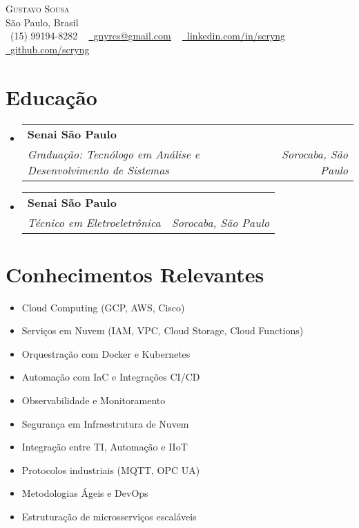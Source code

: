 \documentclass[letterpaper,11pt]{article}
\makeatletter
\newcommand{\resumeSubheading}[4]{
  \vspace{-2pt}\item
    \begin{tabular*}{1.0\textwidth}[t]{l@{\extracolsep{\fill}}r}
      \textbf{#1} & \textbf{\small #2} \\
      \textit{\small#3} & \textit{\small #4} \\
    \end{tabular*}\vspace{-7pt}
}
\newcommand{\resumeSubHeadingListStart}{\begin{itemize}[leftmargin=0.0in, label={}]}
\newcommand{\resumeSubHeadingListEnd}{\end{itemize}}
\makeatother
\begin{document}
\begin{center}
    {\Huge \scshape Gustavo Sousa} \\ \vspace{1pt}
    São Paulo, Brasil \\ \vspace{1pt}
    \small \raisebox{-0.1\height}\faPhone\ (15) 99194-8282 ~ 
    \href{mailto:gnyrcs@gmail.com}{\raisebox{-0.2\height}\faEnvelope\  \underline{gnyrcs@gmail.com}} ~ 
    \href{https://linkedin.com/in/scryng}{\raisebox{-0.2\height}\faLinkedin\ \underline{linkedin.com/in/scryng}}  ~
    \href{https://github.com/scryng}{\raisebox{-0.2\height}\faGithub\ \underline{github.com/scryng}}
    \vspace{-8pt}
\end{center}

\section{Educação}
  \resumeSubHeadingListStart
    \resumeSubheading
      {Senai São Paulo}{}
      {Graduação: Tecnólogo em Análise e Desenvolvimento de Sistemas}{Sorocaba, São Paulo}
    \resumeSubheading
      {Senai São Paulo}{}
      {Técnico em Eletroeletrônica}{Sorocaba, São Paulo}
  \resumeSubHeadingListEnd

\section{Conhecimentos Relevantes}
    \begin{multicols}{2}
        \begin{itemize}[itemsep=-5pt, parsep=3pt]
            \item\small Cloud Computing (GCP, AWS, Cisco)
            \item Serviços em Nuvem (IAM, VPC, Cloud Storage, Cloud Functions)
            \item Orquestração com Docker e Kubernetes
            \item Automação com IaC e Integrações CI/CD
            \item Observabilidade e Monitoramento
            \item Segurança em Infraestrutura de Nuvem
            \item Integração entre TI, Automação e IIoT
            \item Protocolos industriais (MQTT, OPC UA)
            \item Metodologias Ágeis e DevOps
            \item Estruturação de microsserviços escaláveis
        \end{itemize}
    \end{multicols}
    \vspace*{2.0\multicolsep}
\end{document}
